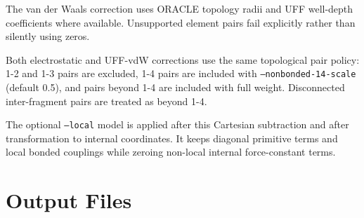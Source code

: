 \documentclass[11pt]{article}
\begin{document}
The van der Waals correction uses ORACLE topology radii and UFF well-depth
coefficients where available.  Unsupported element pairs fail explicitly
rather than silently using zeros.

Both electrostatic and UFF-vdW corrections use the same topological pair
policy: 1-2 and 1-3 pairs are excluded, 1-4 pairs are included with
\texttt{--nonbonded-14-scale} (default 0.5), and pairs beyond 1-4 are included
with full weight.  Disconnected inter-fragment pairs are treated as beyond
1-4.

The optional \texttt{--local} model is applied after this Cartesian subtraction
and after transformation to internal coordinates.  It keeps diagonal primitive
terms and local bonded couplings while zeroing non-local internal
force-constant terms.

\section{Output Files}
\end{document}
